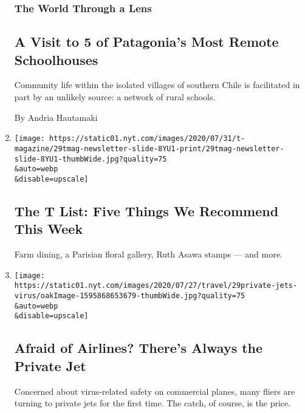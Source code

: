 \begin{enumerate}
  \hypertarget{the-world-through-a-lens}{%
  \subsubsection{The World Through a
  Lens}\label{the-world-through-a-lens}}

  \hypertarget{a-visit-to-5-of-patagonias-most-remote-schoolhouses}{%
  \subsection{A Visit to 5 of Patagonia's Most Remote
  Schoolhouses}\label{a-visit-to-5-of-patagonias-most-remote-schoolhouses}}

  Community life within the isolated villages of southern Chile is
  facilitated in part by an unlikely source: a network of rural schools.

  By Andria Hautamaki
\item
  \href{/2020/07/30/t-magazine/the-t-list-five-things-we-recommend-this-week.html}{}

  \texttt{[image: https://static01.nyt.com/images/2020/07/31/t-magazine/29tmag-newsletter-slide-8YU1-print/29tmag-newsletter-slide-8YU1-thumbWide.jpg?quality=75\\\&auto=webp\\\&disable=upscale]}

  \hypertarget{the-t-list-five-things-we-recommend-this-week}{%
  \subsection{The T List: Five Things We Recommend This
  Week}\label{the-t-list-five-things-we-recommend-this-week}}

  Farm dining, a Parisian floral gallery, Ruth Asawa stamps --- and
  more.
\item
  \href{/2020/07/30/travel/private-jets-coronavirus.html}{}

  \texttt{[image: https://static01.nyt.com/images/2020/07/27/travel/29private-jets-virus/oakImage-1595868653679-thumbWide.jpg?quality=75\\\&auto=webp\\\&disable=upscale]}

  \hypertarget{afraid-of-airlines-theres-always-the-private-jet}{%
  \subsection{Afraid of Airlines? There's Always the Private
  Jet}\label{afraid-of-airlines-theres-always-the-private-jet}}

  Concerned about virus-related safety on commercial planes, many fliers
  are turning to private jets for the first time. The catch, of course,
  is the price.


\end{enumerate}
